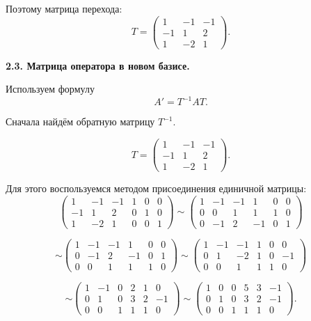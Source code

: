 Поэтому матрица перехода:
\[
T=
\begin{pmatrix}
1 & -1 & -1\\
-1 & 1 & 2\\
1 & -2 & 1
\end{pmatrix}.
\]

\bigskip

\textbf{2.3. Матрица оператора в новом базисе.}

Используем формулу
\[
A' = T^{-1}AT.
\]

Сначала найдём обратную матрицу $T^{-1}$.

\[
T=
\begin{pmatrix}
1 & -1 & -1\\
-1 & 1 & 2\\
1 & -2 & 1
\end{pmatrix}.
\]

Для этого воспользуемся методом присоединения единичной матрицы:
\[
\left(
\begin{array}{ccc|ccc}
1 & -1 & -1 & 1 & 0 & 0\\
-1 & 1 & 2 & 0 & 1 & 0\\
1 & -2 & 1 & 0 & 0 & 1
\end{array}
\right)
\sim
\left(
\begin{array}{ccc|ccc}
1 & -1 & -1 & 1 & 0 & 0\\
0 & 0 & 1 & 1 & 1 & 0\\
0 & -1 & 2 & -1 & 0 & 1
\end{array}
\right)
\]

\[
\sim
\left(
\begin{array}{ccc|ccc}
1 & -1 & -1 & 1 & 0 & 0\\
0 & -1 & 2 & -1 & 0 & 1\\
0 & 0 & 1 & 1 & 1 & 0
\end{array}
\right)
\sim
\left(
\begin{array}{ccc|ccc}
1 & -1 & -1 & 1 & 0 & 0\\
0 & 1 & -2 & 1 & 0 & -1\\
0 & 0 & 1 & 1 & 1 & 0
\end{array}
\right)
\]

\[
\sim
\left(
\begin{array}{ccc|ccc}
1 & -1 & 0 & 2 & 1 & 0\\
0 & 1 & 0 & 3 & 2 & -1\\
0 & 0 & 1 & 1 & 1 & 0
\end{array}
\right)
\sim
\left(
\begin{array}{ccc|ccc}
1 & 0 & 0 & 5 & 3 & -1\\
0 & 1 & 0 & 3 & 2 & -1\\
0 & 0 & 1 & 1 & 1 & 0
\end{array}
\right).
\]

